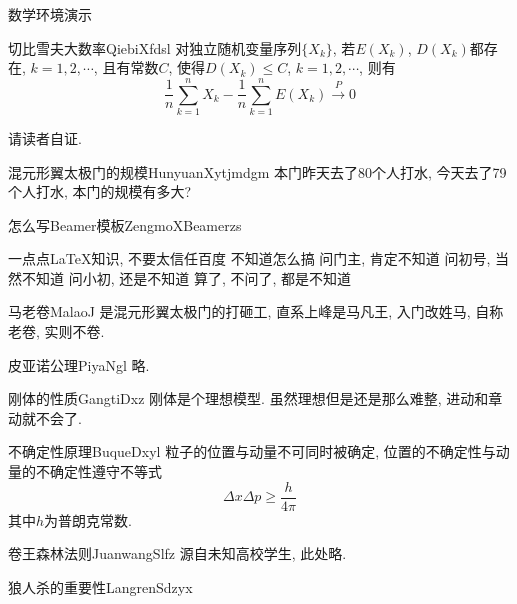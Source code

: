\documentclass[hyperref,UTF8,11pt]{beamer}
\begin{document}
\begin{frame}{数学环境演示}
	\begin{SCUtheorem}{切比雪夫大数率}{QiebiXfdsl}
		对独立随机变量序列$\{X_k\}$, 若$E(X_k)$, $D(X_k)$都存在, $k=1,2,\cdots$, 且有常数$C$, 使得$D(X_k)\leq C$, $k=1,2,\cdots$, 则有
		\begin{equation}
		\dfrac{1}{n} \sum_{k=1}^{n} X_k - \dfrac{1}{n} \sum_{k=1}^{n} E(X_k) \stackrel{\;P\;}{\longrightarrow} 0
		\end{equation}
	\end{SCUtheorem}
	\begin{SCUproof}{}
		请读者自证.
	\end{SCUproof}
	\begin{SCUexample}{混元形翼太极门的规模}{HunyuanXytjmdgm}
		本门昨天去了80个人打水, 今天去了79个人打水, 本门的规模有多大?
	\end{SCUexample}
	\begin{SCUalgorithm}{怎么写Beamer模板}{ZengmoXBeamerzs}
		\begin{algorithmic}[1]
		\REQUIRE 一点点\LaTeX 知识, 不要太信任百度
		\ENSURE 不知道怎么搞
		\STATE 问门主, 肯定不知道
		\STATE 问初号, 当然不知道
		\STATE 问小初, 还是不知道
		\RETURN 算了, 不问了, 都是不知道
		\end{algorithmic}
	\end{SCUalgorithm}
	\begin{SCUdefinition}{马老卷}{MalaoJ}
		是混元形翼太极门的打砸工, 直系上峰是马凡王, 入门改姓马, 自称老卷, 实则不卷.
	\end{SCUdefinition}
	\begin{SCUaxiom}{皮亚诺公理}{PiyaNgl}
		略.
	\end{SCUaxiom}
	\begin{SCUproperty}{刚体的性质}{GangtiDxz}
		刚体是个理想模型. 虽然理想但是还是那么难整, 进动和章动就不会了.
	\end{SCUproperty}
	\begin{SCUproposition}{不确定性原理}{BuqueDxyl}
		粒子的位置与动量不可同时被确定, 位置的不确定性与动量的不确定性遵守不等式
		\begin{equation}
			\Delta x \Delta p \geq \dfrac{h}{4\pi}
		\end{equation}
		其中$h$为普朗克常数.
	\end{SCUproposition}
	\begin{SCUlemma}{卷王森林法则}{JuanwangSlfz}
		源自未知高校学生, 此处略.
	\end{SCUlemma}
	\begin{SCUcorollary}{狼人杀的重要性}{LangrenSdzyx}

\end{SCUcorollary}
\end{frame}
\end{document}
